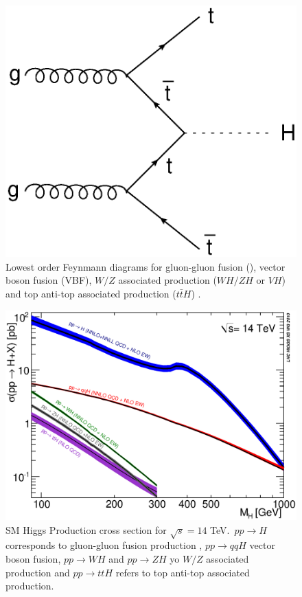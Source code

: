 \begin{figure}[h]
\begin{minipage}[h]{0.4\linewidth}
						\includegraphics[width=1\linewidth]{T/FIGS/tth}
					\end{minipage}
				\caption[Feynmann diagrams of lowest order Higgs production processes]{Lowest order Feynmann diagrams for gluon-gluon fusion (\ggF), vector boson fusion (VBF), $W/Z$ associated production ($WH/ZH$ or $VH$) and top anti-top associated production ($t\bar{t}H$) \cite{higgsproduction}.}
				\label{fig:higgsproddiag}
			\end{figure}

			\begin{figure}[h]
				\centering
				\includegraphics[width=0.7\linewidth]{T/FIGS/YRHXS_Summary_fig3}
				\caption[Higgs production cross section as a function of Higgs mass at a $\sqrt{s}=14$TeV]{SM Higgs Production cross section for $\sqrt{s}=14$ TeV. $\,pp\rightarrow H$ corresponds to gluon-gluon fusion production , $pp\rightarrow qqH$ vector boson fusion, $pp\rightarrow WH$ and $pp\rightarrow ZH$ yo $W/Z$ associated production and  $pp\rightarrow ttH$ refers to top anti-top associated production.  \cite{LHCHiggsCS}}
				\label{fig:higgsproductionCS}
			\end{figure}


